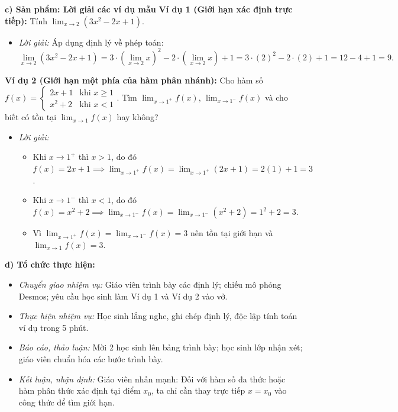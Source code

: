 \documentclass[12pt, a4paper]{article}
\begin{document}
\noindent \textbf{c) Sản phẩm: Lời giải các ví dụ mẫu}
\textbf{Ví dụ 1 (Giới hạn xác định trực tiếp):} Tính $\lim_{x \to 2} (3x^2 - 2x + 1)$.
\begin{itemize}[leftmargin=0.6cm]
    \item \textit{Lời giải:} Áp dụng định lý về phép toán:
    $$\lim_{x \to 2} (3x^2 - 2x + 1) = 3 \cdot (\lim_{x \to 2} x)^2 - 2 \cdot (\lim_{x \to 2} x) + 1 = 3 \cdot (2)^2 - 2 \cdot (2) + 1 = 12 - 4 + 1 = 9.$$
\end{itemize}

\textbf{Ví dụ 2 (Giới hạn một phía của hàm phân nhánh):} Cho hàm số $f(x) = \begin{cases} 2x + 1 & \text{khi } x \ge 1 \\ x^2 + 2 & \text{khi } x < 1 \end{cases}$. Tìm $\lim_{x \to 1^+} f(x)$, $\lim_{x \to 1^-} f(x)$ và cho biết có tồn tại $\lim_{x \to 1} f(x)$ hay không?
\begin{itemize}[leftmargin=0.6cm]
    \item \textit{Lời giải:}
    \begin{itemize}
        \item Khi $x \to 1^+$ thì $x > 1$, do đó $f(x) = 2x + 1 \implies \lim_{x \to 1^+} f(x) = \lim_{x \to 1^+} (2x + 1) = 2(1) + 1 = 3$.
        \item Khi $x \to 1^-$ thì $x < 1$, do đó $f(x) = x^2 + 2 \implies \lim_{x \to 1^-} f(x) = \lim_{x \to 1^-} (x^2 + 2) = 1^2 + 2 = 3$.
        \item Vì $\lim_{x \to 1^+} f(x) = \lim_{x \to 1^-} f(x) = 3$ nên tồn tại giới hạn và $\lim_{x \to 1} f(x) = 3$.
    \end{itemize}
\end{itemize}

\noindent \textbf{d) Tổ chức thực hiện:}
\begin{itemize}[leftmargin=0.8cm]
    \item \textit{Chuyển giao nhiệm vụ:} Giáo viên trình bày các định lý; chiếu mô phỏng Desmos; yêu cầu học sinh làm Ví dụ 1 và Ví dụ 2 vào vở.
    \item \textit{Thực hiện nhiệm vụ:} Học sinh lắng nghe, ghi chép định lý, độc lập tính toán ví dụ trong 5 phút.
    \item \textit{Báo cáo, thảo luận:} Mời 2 học sinh lên bảng trình bày; học sinh lớp nhận xét; giáo viên chuẩn hóa các bước trình bày.
    \item \textit{Kết luận, nhận định:} Giáo viên nhấn mạnh: Đối với hàm số đa thức hoặc hàm phân thức xác định tại điểm $x_0$, ta chỉ cần thay trực tiếp $x = x_0$ vào công thức để tìm giới hạn.
\end{itemize}
\end{document}

